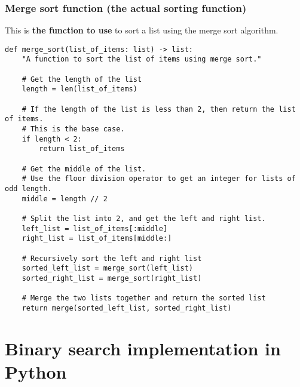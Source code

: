 \documentclass[11pt]{article}
\begin{document}
 \newpage
\subsubsection{Merge sort function (the actual sorting function)}
\label{sec:org45729a5}
This is \textbf{the function to use} to sort a list using the merge sort algorithm.
\begin{verbatim}
def merge_sort(list_of_items: list) -> list:
    "A function to sort the list of items using merge sort."

    # Get the length of the list
    length = len(list_of_items)

    # If the length of the list is less than 2, then return the list of items.
    # This is the base case.
    if length < 2:
        return list_of_items

    # Get the middle of the list.
    # Use the floor division operator to get an integer for lists of odd length.
    middle = length // 2

    # Split the list into 2, and get the left and right list.
    left_list = list_of_items[:middle]
    right_list = list_of_items[middle:]

    # Recursively sort the left and right list
    sorted_left_list = merge_sort(left_list)
    sorted_right_list = merge_sort(right_list)

    # Merge the two lists together and return the sorted list
    return merge(sorted_left_list, sorted_right_list)
\end{verbatim}

 \newpage
\section{Binary search implementation in Python}
\label{sec:org2d011b9}
\end{document}

